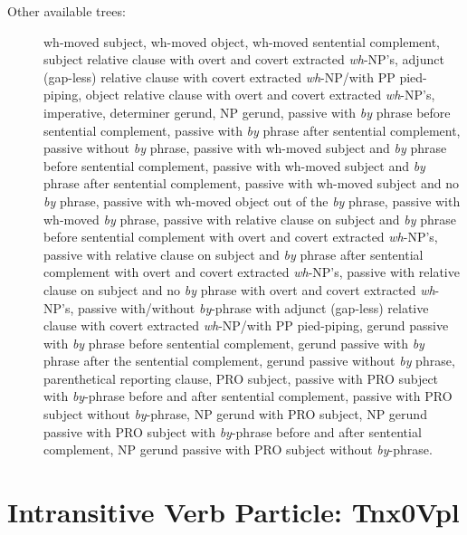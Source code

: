 \begin{description}
\item[Other available trees:] wh-moved subject, wh-moved object, wh-moved
sentential complement, subject relative clause with overt and covert
extracted {\it wh}-NP's, adjunct (gap-less) relative clause with covert
extracted {\it wh}-NP/with PP pied-piping, object relative clause with
overt and covert extracted {\it wh}-NP's, imperative, determiner gerund, NP
gerund, passive with {\it by} phrase before sentential complement, passive
with {\it by} phrase after sentential complement, passive without {\it by}
phrase, passive with wh-moved subject and {\it by} phrase before sentential
complement, passive with wh-moved subject and {\it by} phrase after
sentential complement, passive with wh-moved subject and no {\it by}
phrase, passive with wh-moved object out of the {\it by} phrase, passive
with wh-moved {\it by} phrase, passive with relative clause on subject and
{\it by} phrase before sentential complement with overt and covert
extracted {\it wh}-NP's, passive with relative clause on subject and {\it
by} phrase after sentential complement with overt and covert extracted {\it
wh}-NP's, passive with relative clause on subject and no {\it by} phrase
with overt and covert extracted {\it wh}-NP's, passive with/without {\it
by}-phrase with adjunct (gap-less) relative clause with covert extracted
{\it wh}-NP/with PP pied-piping, gerund passive with {\it by} phrase before
sentential complement, gerund passive with {\it by} phrase after the
sentential complement, gerund passive without {\it by} phrase,
parenthetical reporting clause, PRO subject, passive with PRO subject with
{\it by}-phrase before and after sentential complement, passive with PRO
subject without {\it by}-phrase, NP gerund with PRO subject, NP gerund
passive with PRO subject with {\it by}-phrase before and after sentential
complement, NP gerund passive with PRO subject without {\it by}-phrase.

\end{description}

\section{Intransitive Verb Particle: Tnx0Vpl}
\label{nx0Vpl}

